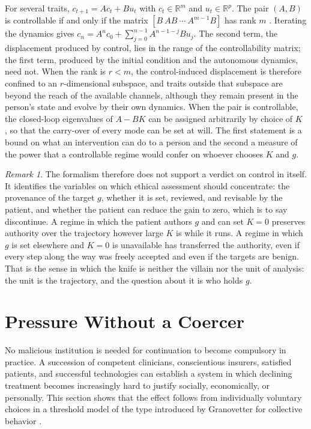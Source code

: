 \documentclass[11pt]{article}
\theoremstyle{plain}
\theoremstyle{definition}
\theoremstyle{remark}
\newtheorem{remark}{Remark}
\newcommand{\R}{\mathbb{R}}
\begin{document}
For several traits, $c_{t+1}=Ac_t+Bu_t$ with $c_t\in\R^m$ and $u_t\in\R^p$. The pair $(A,B)$ is controllable if and only if the matrix $[B\ AB\ \cdots\ A^{m-1}B]$ has rank $m$ \cite{kailath1980}. Iterating the dynamics gives $c_n=A^nc_0+\sum_{j=0}^{n-1}A^{n-1-j}Bu_j$. The second term, the displacement produced by control, lies in the range of the controllability matrix; the first term, produced by the initial condition and the autonomous dynamics, need not. When the rank is $r<m$, the control-induced displacement is therefore confined to an $r$-dimensional subspace, and traits outside that subspace are beyond the reach of the available channels, although they remain present in the person's state and evolve by their own dynamics. When the pair is controllable, the closed-loop eigenvalues of $A-BK$ can be assigned arbitrarily by choice of $K$ \cite{wonham1967}, so that the carry-over of every mode can be set at will. The first statement is a bound on what an intervention can do to a person and the second a measure of the power that a controllable regime would confer on whoever chooses $K$ and $g$.

\begin{remark}
The formalism therefore does not support a verdict on control in itself. It identifies the variables on which ethical assessment should concentrate: the provenance of the target $g$, whether it is set, reviewed, and revisable by the patient, and whether the patient can reduce the gain to zero, which is to say discontinue. A regime in which the patient authors $g$ and can set $K=0$ preserves authority over the trajectory however large $K$ is while it runs. A regime in which $g$ is set elsewhere and $K=0$ is unavailable has transferred the authority, even if every step along the way was freely accepted and even if the targets are benign. That is the sense in which the knife is neither the villain nor the unit of analysis: the unit is the trajectory, and the question about it is who holds $g$.
\end{remark}

\section{Pressure Without a Coercer}\label{sec:cascade}

No malicious institution is needed for continuation to become compulsory in practice. A succession of competent clinicians, conscientious insurers, satisfied patients, and successful technologies can establish a system in which declining treatment becomes increasingly hard to justify socially, economically, or personally. This section shows that the effect follows from individually voluntary choices in a threshold model of the type introduced by Granovetter for collective behavior \cite{granovetter1978}.
\end{document}
